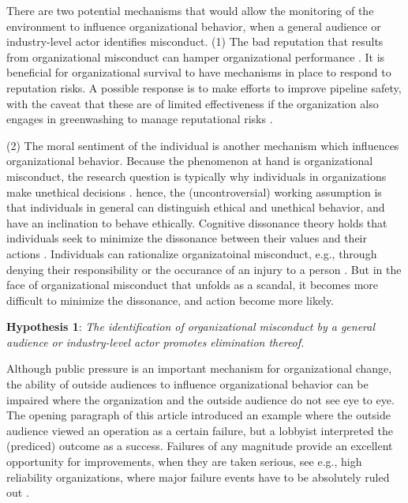 There are two potential mechanisms that would allow the monitoring of the environment to influence organizational behavior, when a general audience or industry-level actor identifies misconduct. (1) The bad reputation that results from organizational misconduct can hamper organizational performance \citep{Park2019}. It is beneficial for organizational survival to have mechanisms in place to respond to reputation risks. A possible response is to make efforts to improve pipeline safety, with the caveat that these are of limited effectiveness if the organization also engages in greenwashing to manage reputational risks \citep{Kim2015, Lyon2015}.

(2) The moral sentiment of the individual is another mechanism which influences organizational behavior. Because the phenomenon at hand is organizational misconduct, the research question is typically why individuals in organizations make unethical decisions \citep[e.g.,][]{Moore2008}. hence, the (uncontroversial) working assumption is that individuals in general can distinguish ethical and unethical behavior, and have an inclination to behave ethically. Cognitive dissonance theory holds that individuals seek to minimize the dissonance between their values and their actions \citep{Festinger1962}. Individuals can rationalize organizatoinal misconduct, e.g., through denying their responsibility or the occurance of an injury to a person \citep{Ashforth2003}. But in the face of organizational misconduct that unfolds as a scandal, it becomes more difficult to minimize the dissonance, and action become more likely.

\textbf{Hypothesis 1}: \textit{The identification of organizational misconduct by a general audience or industry-level actor promotes elimination thereof.}

Although public pressure is an important mechanism for organizational change, the ability of outside audiences to influence organizational behavior can be impaired where the organization and the outside audience do not see eye to eye. The opening paragraph of this article introduced an example where the outside audience viewed an operation as a certain failure, but a lobbyist interpreted the (prediced) outcome as a success. Failures of any magnitude provide an excellent opportunity for improvements, when they are taken serious, see e.g., high reliability organizations, where major failure events have to be absolutely ruled out \citep{Carroll1998}.

